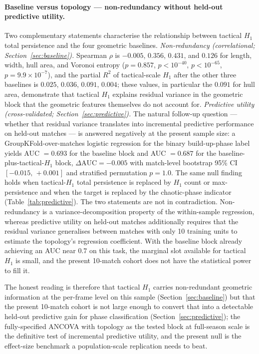 \paragraph{Baseline versus topology --- non-redundancy without held-out predictive utility.}
Two complementary statements characterise the relationship between tactical \(H_1\) total persistence and the four geometric baselines. \emph{Non-redundancy (correlational; Section~\ref{sec:baseline}).} Spearman \(\rho\) is \(-0.005\), \(0.356\), \(0.431\), and \(0.126\) for length, width, hull area, and Voronoi entropy (\(p=0.857\), \(p<10^{-40}\), \(p<10^{-65}\), \(p=9.9\times10^{-7}\)), and the partial \(R^2\) of tactical-scale \(H_1\) after the other three baselines is \(0.025\), \(0.036\), \(0.091\), \(0.004\); these values, in particular the \(0.091\) for hull area, demonstrate that tactical \(H_1\) explains residual variance in the geometric block that the geometric features themselves do not account for. \emph{Predictive utility (cross-validated; Section~\ref{sec:predictive}).} The natural follow-up question --- whether that residual variance translates into incremental predictive performance on held-out matches --- is answered negatively at the present sample size: a GroupKFold-over-matches logistic regression for the binary build-up-phase label yields AUC \(=0.693\) for the baseline block and AUC \(=0.687\) for the baseline-plus-tactical-\(H_1\) block, \(\Delta\text{AUC}=-0.005\) with match-level bootstrap 95\% CI \([-0.015,\,+0.001]\) and stratified permutation \(p=1.0\). The same null finding holds when tactical-\(H_1\) total persistence is replaced by \(H_1\) count or max-persistence and when the target is replaced by the chaotic-phase indicator (Table~\ref{tab:predictive}). The two statements are not in contradiction. Non-redundancy is a variance-decomposition property of the within-sample regression, whereas predictive utility on held-out matches additionally requires that the residual variance generalises between matches with only 10 training units to estimate the topology's regression coefficient. With the baseline block already achieving an AUC near \(0.7\) on this task, the marginal slot available for tactical \(H_1\) is small, and the present 10-match cohort does not have the statistical power to fill it.

The honest reading is therefore that tactical \(H_1\) carries non-redundant geometric information at the per-frame level on this sample (Section~\ref{sec:baseline}) but that the present 10-match cohort is not large enough to convert that into a detectable held-out predictive gain for phase classification (Section~\ref{sec:predictive}); the fully-specified ANCOVA with topology as the tested block at full-season scale is the definitive test of incremental predictive utility, and the present null is the effect-size benchmark a population-scale replication needs to beat.

